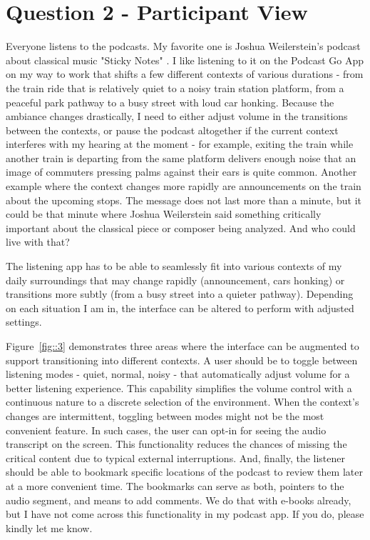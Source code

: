 \documentclass[12pt,letterpaper]{article}
\begin{document}
\section*{Question 2 - Participant View}
Everyone listens to the podcasts. My favorite one is Joshua Weilerstein's podcast about classical music "Sticky Notes" \cite{sticky_notes}. I like listening to it on the Podcast Go App on my way to work that shifts a few different contexts of various durations - from the train ride that is relatively quiet to a noisy train station platform, from a peaceful park pathway to a busy street with loud car honking. Because the ambiance changes drastically, I need to either adjust volume in the transitions between the contexts, or pause the podcast altogether if the current context interferes with my hearing at the moment - for example, exiting the train while another train is departing from the same platform delivers enough noise that an image of commuters pressing palms against their ears is quite common.
Another example where the context changes more rapidly are announcements on the train about the upcoming stops. The message does not last more than a minute, but it could be that minute where Joshua Weilerstein said something critically important about the classical piece or composer being analyzed. And who could live with that?

The listening app has to be able to seamlessly fit into various contexts of my daily surroundings that may change rapidly (announcement, cars honking) or transitions more subtly (from a busy street into a quieter pathway). Depending on each situation I am in, the interface can be altered to perform with adjusted settings. 

Figure~\ref{fig::3} demonstrates three areas where the interface can be augmented to support transitioning into different contexts. A user should be to toggle between listening modes - quiet, normal, noisy - that automatically adjust volume for a better listening experience. This capability simplifies the volume control with a continuous nature to a discrete selection of the environment. When the context's changes are intermittent, toggling between modes might not be the most convenient feature. In such cases, the user can opt-in for seeing the audio transcript on the screen. This functionality reduces the chances of missing the critical content due to typical external interruptions. And, finally, the listener should be able to bookmark specific locations of the podcast to review them later at a more convenient time. The bookmarks can serve as both, pointers to the audio segment, and means to add comments. We do that with e-books already, but I have not come across this functionality in my podcast app. If you do, please kindly let me know. 
\end{document}
